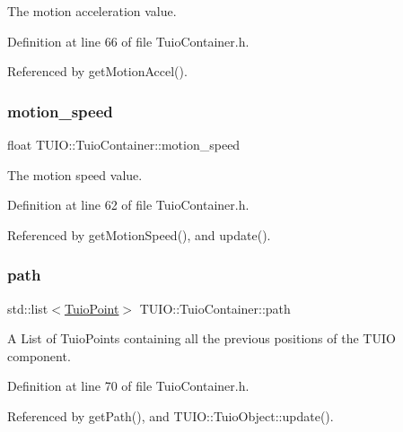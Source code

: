The motion acceleration value. 

Definition at line 66 of file Tuio\+Container.\+h.



Referenced by get\+Motion\+Accel().

\mbox{\label{class_t_u_i_o_1_1_tuio_container_a7810725234e427d4508f6b6a9874723b}} 
\subsubsection{\texorpdfstring{motion\+\_\+speed}{motion\_speed}}
{\footnotesize\ttfamily float T\+U\+I\+O\+::\+Tuio\+Container\+::motion\+\_\+speed\hspace{0.3cm}{\ttfamily [protected]}}

The motion speed value. 

Definition at line 62 of file Tuio\+Container.\+h.



Referenced by get\+Motion\+Speed(), and update().

\mbox{\label{class_t_u_i_o_1_1_tuio_container_a4bdb8935091e0736b6c19ce9fd676b9a}} 
\subsubsection{\texorpdfstring{path}{path}}
{\footnotesize\ttfamily std\+::list$<$\hyperlink{class_t_u_i_o_1_1_tuio_point}{Tuio\+Point}$>$ T\+U\+I\+O\+::\+Tuio\+Container\+::path\hspace{0.3cm}{\ttfamily [protected]}}

A List of Tuio\+Points containing all the previous positions of the T\+U\+IO component. 

Definition at line 70 of file Tuio\+Container.\+h.



Referenced by get\+Path(), and T\+U\+I\+O\+::\+Tuio\+Object\+::update().

\mbox{\label{class_t_u_i_o_1_1_tuio_container_ab8249dadd0e87ff0b93078b731bec603}} 
